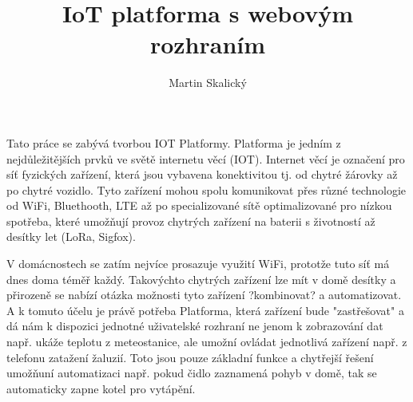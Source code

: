\documentclass[thesis=B,czech]{FITthesis}[2019/12/23]
\title{IoT platforma s webovým rozhraním}
\author{Martin Skalický} %
\begin{document}

\begin{introduction}
    Tato práce se zabývá tvorbou IOT Platformy. Platforma je jedním z nejdůležitějších prvků ve světě internetu věcí (IOT). Internet věcí je označení pro síť fyzických zařízení, která jsou vybavena konektivitou tj. od chytré žárovky až po chytré vozidlo. Tyto zařízení mohou spolu komunikovat přes různé technologie od WiFi, Bluethooth, LTE až po specializované sítě optimalizované pro nízkou spotřeba, které umožňují provoz chytrých zařízení na baterii s životností až desítky let (LoRa, Sigfox).
    
    V domácnostech se zatím nejvíce prosazuje využití WiFi, prototže tuto síť má dnes doma téměř každý. Takovýchto chytrých zařízení lze mít v domě desítky a přirozeně se nabízí otázka možnosti tyto zařízení ?kombinovat? a automatizovat. A k tomuto účelu je právě potřeba Platforma, která zařízení bude "zastřešovat" a dá nám k dispozici jednotné uživatelské rozhraní ne jenom k zobrazování dat např. ukáže teplotu z meteostanice, ale umožní ovládat jednotlivá zařízení např. z telefonu zatažení žaluzií. Toto jsou pouze základní funkce a chytřejší řešení umožňuní automatizaci např. pokud čidlo zaznamená pohyb v domě, tak se automaticky zapne kotel pro vytápění. 
    


\end{introduction}
\end{document}
